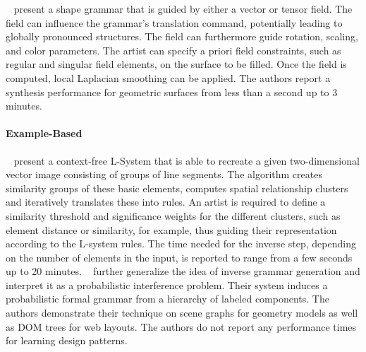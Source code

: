 \citeauthor*{yuanyuan_2011_gso}~\cite{yuanyuan_2011_gso} present a shape grammar that is guided by either a vector or tensor field. The field can influence the grammar's translation command, potentially leading to globally pronounced structures. The field can furthermore guide rotation, scaling, and color parameters. The artist can specify a priori field constraints, such as regular and singular field elements, on the surface to be filled. Once the field is computed, local Laplacian smoothing can be applied. The authors report a synthesis performance for geometric surfaces from less than a second up to 3 minutes. 


\paragraph*{Example-Based}
\label{para:analysis_rulebased_example}

\citeauthor*{stava_2010_ipm}~\cite{stava_2010_ipm} present a context-free L-System that is able to recreate a given two-dimensional vector image consisting of groups of line segments. The algorithm creates similarity groups of these basic elements, computes spatial relationship clusters and iteratively translates these into rules. An artist is required to define a similarity threshold and significance weights for the different clusters, such as element distance or similarity, for example, thus guiding their representation according to the L-system rules. The time needed for the inverse step, depending on the number of elements in the input, is reported to range from a few seconds up to 20 minutes. \citeauthor*{talton_2012_ldp}~\cite{talton_2012_ldp} further generalize the idea of inverse grammar generation and interpret it as a probabilistic interference problem. Their system induces a probabilistic formal grammar from a hierarchy of labeled components. The authors demonstrate their technique on scene graphs for geometry models as well as DOM trees for web layouts. The authors do not report any performance times for learning design patterns.


